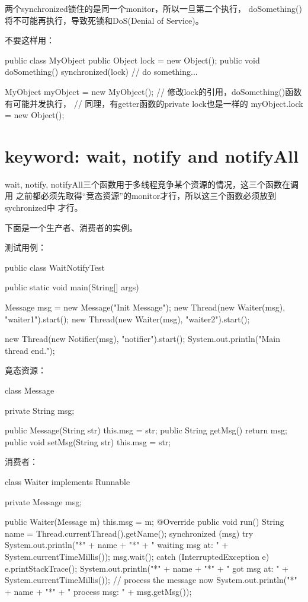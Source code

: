 \documentclass[a4paper,11pt]{article}
\begin{document}
两个synchronized锁住的是同一个monitor，所以一旦第二个执行，
doSomething()将不可能再执行，导致死锁和DoS(Denial of Service)。

不要这样用：\\
\begin{javacode}
public class MyObject {
    public Object lock = new Object();
    public void doSomething() {
        synchronized(lock) {
            // do something...
        }
    }
}

MyObject myObject = new MyObject();
// 修改lock的引用，doSomething()函数有可能并发执行，
// 同理，有getter函数的private lock也是一样的
myObject.lock = new Object();
\end{javacode}



\section[keyword: wait, notify and notifyAll]{keyword: wait, notify and notifyAll}
wait, notify, notifyAll三个函数用于多线程竞争某个资源的情况，这三个函数在调用
之前都必须先取得“竞态资源”的monitor才行，所以这三个函数必须放到sychronized中
才行。

下面是一个生产者、消费者的实例。

测试用例：

\begin{javacode}
public class WaitNotifyTest {
  public static void main(String[] args) {
    Message msg = new Message("Init Message");
    new Thread(new Waiter(msg), "waiter1").start();
    new Thread(new Waiter(msg), "waiter2").start();

    new Thread(new Notifier(msg), "notifier").start();
    System.out.println("Main thread end.");
  }
}
\end{javacode}

竟态资源：

\begin{javacode}
class Message {
  private String msg;

  public Message(String str) {
    this.msg = str;
  }
  public String getMsg() {
    return msg;
  }
  public void setMsg(String str) {
    this.msg = str;
  }
}
\end{javacode}

消费者：

\begin{javacode}
class Waiter implements Runnable {
  private Message msg;

  public Waiter(Message m) {
    this.msg = m;
  }
  @Override
  public void run() {
    String name = Thread.currentThread().getName();
    synchronized (msg) {
      try {
        System.out.println("*" + name + "*" + " waiting msg at: "
                           + System.currentTimeMillis());
        msg.wait();
      } catch (InterruptedException e) {
        e.printStackTrace();
      }
      System.out.println("*" + name + "*" + " got msg at: "
                         + System.currentTimeMillis());
      // process the message now
      System.out.println("*" + name + "*" + " process msg: " + msg.getMsg());
    }
  }
}
\end{javacode}
\end{document}
